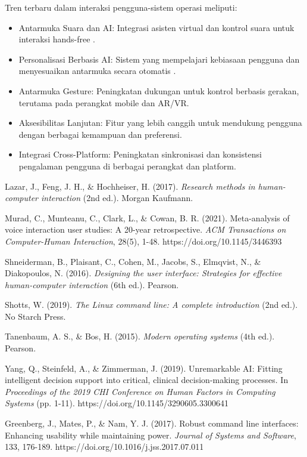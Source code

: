 \documentclass[12pt]{article}
\begin{document}
	Tren terbaru dalam interaksi pengguna-sistem operasi meliputi:
	\begin{itemize}
		\item Antarmuka Suara dan AI: Integrasi asisten virtual dan kontrol suara untuk interaksi hands-free \cite{Murad2021}.
		\item Personalisasi Berbasis AI: Sistem yang mempelajari kebiasaan pengguna dan menyesuaikan antarmuka secara otomatis \cite{Yang2019}.
		\item Antarmuka Gesture: Peningkatan dukungan untuk kontrol berbasis gerakan, terutama pada perangkat mobile dan AR/VR.
		\item Aksesibilitas Lanjutan: Fitur yang lebih canggih untuk mendukung pengguna dengan berbagai kemampuan dan preferensi.
		\item Integrasi Cross-Platform: Peningkatan sinkronisasi dan konsistensi pengalaman pengguna di berbagai perangkat dan platform.
	\end{itemize}
	\begin{thebibliography}{9}
		
		Lazar, J., Feng, J. H., \& Hochheiser, H. (2017). \textit{Research methods in human-computer interaction} (2nd ed.). Morgan Kaufmann.
		
		Murad, C., Munteanu, C., Clark, L., \& Cowan, B. R. (2021). Meta-analysis of voice interaction user studies: A 20-year retrospective. \textit{ACM Transactions on Computer-Human Interaction}, 28(5), 1-48. https://doi.org/10.1145/3446393
		
		Shneiderman, B., Plaisant, C., Cohen, M., Jacobs, S., Elmqvist, N., \& Diakopoulos, N. (2016). \textit{Designing the user interface: Strategies for effective human-computer interaction} (6th ed.). Pearson.
		
		Shotts, W. (2019). \textit{The Linux command line: A complete introduction} (2nd ed.). No Starch Press.
		
		Tanenbaum, A. S., \& Bos, H. (2015). \textit{Modern operating systems} (4th ed.). Pearson.
		
		Yang, Q., Steinfeld, A., \& Zimmerman, J. (2019). Unremarkable AI: Fitting intelligent decision support into critical, clinical decision-making processes. In \textit{Proceedings of the 2019 CHI Conference on Human Factors in Computing Systems} (pp. 1-11). https://doi.org/10.1145/3290605.3300641
		
		Greenberg, J., Mates, P., \& Nam, Y. J. (2017). Robust command line interfaces: Enhancing usability while maintaining power. \textit{Journal of Systems and Software}, 133, 176-189. https://doi.org/10.1016/j.jss.2017.07.011
		
	\end{thebibliography}
	
\end{document}
